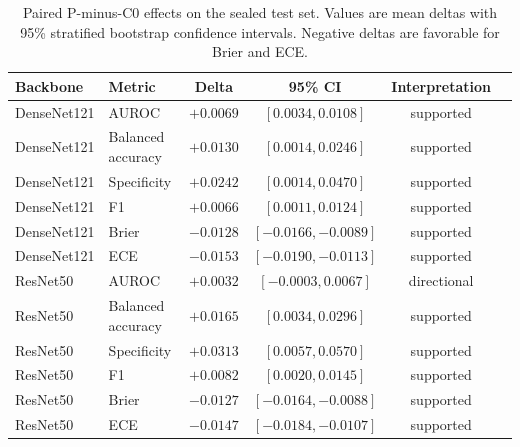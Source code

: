 \documentclass[runningheads]{llncs}
\begin{document}
\begin{table}[htbp]
\centering
\caption{Locked 624-image sealed-test classification performance across three
seeds. Values are mean $\pm$ standard deviation across seeds.}
\label{tab:classification}
{\setlength{\tabcolsep}{4pt}
}
\end{table}

\begin{table}[htbp]
\centering
\caption{Paired P-minus-C0 effects on the sealed test set. Values are mean
deltas with 95\% stratified bootstrap confidence intervals. Negative deltas are
favorable for Brier and ECE.}
\label{tab:classification-deltas}
{\setlength{\tabcolsep}{5pt}
\begin{tabular}{llcccc}
\toprule
Backbone & Metric & Delta & 95\% CI & Interpretation \\
\midrule
DenseNet121 & AUROC & $+0.0069$ & $[0.0034,0.0108]$ & supported \\
DenseNet121 & Balanced accuracy & $+0.0130$ & $[0.0014,0.0246]$ & supported \\
DenseNet121 & Specificity & $+0.0242$ & $[0.0014,0.0470]$ & supported \\
DenseNet121 & F1 & $+0.0066$ & $[0.0011,0.0124]$ & supported \\
DenseNet121 & Brier & $-0.0128$ & $[-0.0166,-0.0089]$ & supported \\
DenseNet121 & ECE & $-0.0153$ & $[-0.0190,-0.0113]$ & supported \\
ResNet50 & AUROC & $+0.0032$ & $[-0.0003,0.0067]$ & directional \\
ResNet50 & Balanced accuracy & $+0.0165$ & $[0.0034,0.0296]$ & supported \\
ResNet50 & Specificity & $+0.0313$ & $[0.0057,0.0570]$ & supported \\
ResNet50 & F1 & $+0.0082$ & $[0.0020,0.0145]$ & supported \\
ResNet50 & Brier & $-0.0127$ & $[-0.0164,-0.0088]$ & supported \\
ResNet50 & ECE & $-0.0147$ & $[-0.0184,-0.0107]$ & supported \\
\bottomrule
\end{tabular}}
\end{table}
\end{document}
